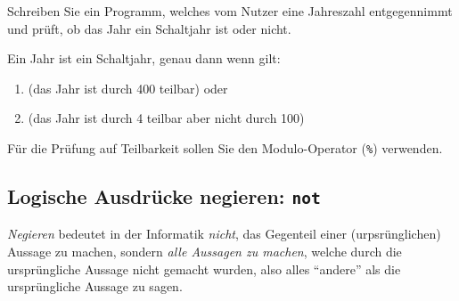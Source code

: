 \begin{mychallenge}
	Schreiben Sie ein Programm, welches vom Nutzer eine Jahreszahl entgegennimmt und prüft, ob das Jahr ein Schaltjahr ist oder nicht.

	Ein Jahr ist ein Schaltjahr, genau dann wenn gilt:
	\begin{enumerate}
		\item (das Jahr ist durch 400 teilbar) oder
		\item (das Jahr ist durch 4 teilbar aber nicht durch 100)
	\end{enumerate}
	Für die Prüfung auf Teilbarkeit sollen Sie den Modulo-Operator (\lstinline|%|) verwenden.
	\begin{myanswer}
		
	\end{myanswer}
\end{mychallenge}

\subsection{Logische Ausdrücke negieren: \texorpdfstring{\lstinline|not|}{not}}
\textit{Negieren} bedeutet in der Informatik \textit{nicht}, das Gegenteil einer (urpsrünglichen) Aussage zu machen, sondern \textit{alle Aussagen zu machen}, welche durch die ursprüngliche Aussage nicht gemacht wurden, also alles \enquote{andere} als die ursprüngliche Aussage zu sagen.


